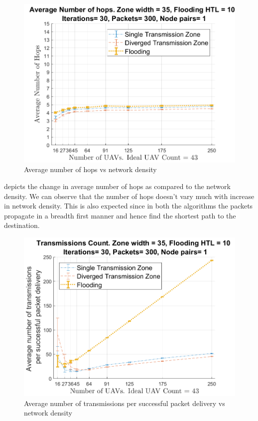 \begin{figure}[hbtp]
\centering
\includegraphics[width=\simResultFigSize\textwidth]{ncsuthesis-0.6/Chapter-5/figs/ND_hops}
\caption{Average number of hops vs network density}
\label{fig:ND_hops}
\end{figure}

 depicts the change in average number of hops as compared to the network density. We can observe that the number of hops doesn't vary much with increase in network density. This is also expected since in both the algorithms the packets propagate in a breadth first manner and hence find the shortest path to the destination. 

\begin{figure}[hbtp]
\centering
\includegraphics[width=\simResultFigSize\textwidth]{ncsuthesis-0.6/Chapter-5/figs/ND_trans}
\caption{Average number of transmissions per successful packet delivery vs network density}
\label{fig:ND_trans}
\end{figure}

